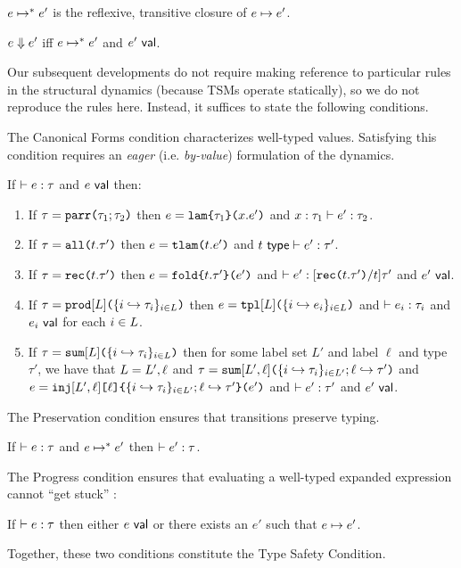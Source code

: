 \begin{definition}\label{defn:iterated-transition-U} $e \mapsto^{*} e'$ is the reflexive, transitive closure of $e \mapsto e'$.\end{definition}

\begin{definition}[Evaluation]\label{defn:evaluation-U}  $e \Downarrow e'$ iff $e \mapsto^{*} e'$ and $e'~\mathsf{val}$. \end{definition}

Our subsequent developments do not require making reference to particular rules in the structural dynamics (because TSMs operate statically), so we do not reproduce the rules here. Instead, it suffices to state the following conditions.

The Canonical Forms condition characterizes well-typed values. Satisfying this condition requires an \emph{eager} (i.e. \emph{by-value}) formulation of the dynamics. 
\begin{condition}\label{condition:canonical-forms-U} If $\vdash e : \tau$ and $e~\mathsf{val}$ then:
\begin{enumerate}
\item If $\tau=\texttt{parr}\texttt{(}\tau_1; \tau_2\texttt{)}$ then $e=\texttt{lam}\texttt{\{}\tau_1\texttt{\}(}x.e'\texttt{)}$ and $x : \tau_1 \vdash e' : \tau_2$.
\item If $\tau=\texttt{all}\texttt{(}t.\tau'\texttt{)}$ then $e=\texttt{tlam}\texttt{(}t.e'\texttt{)}$ and $t~\mathsf{type} \vdash e' : \tau'$.
\item If $\tau=\texttt{rec}\texttt{(}t.\tau'\texttt{)}$ then $e=\texttt{fold}\texttt{\{}t.\tau'\texttt{\}(}e'\texttt{)}$ and $\vdash e' : [\texttt{rec}\texttt{(}t.\tau'\texttt{)}/t]\tau'$ and $e'~\mathsf{val}$. 
\item If $\tau=\texttt{prod}[L]\texttt{(}\{i \hookrightarrow \tau_{i}\}_{i \in L}\texttt{)}$ then $e=\texttt{tpl}[L]\texttt{(}\{i \hookrightarrow e_{i}\}_{i \in L}\texttt{)}$ and $\vdash e_i : \tau_i$ and $e_i~\mathsf{val}$ for each $i \in L$.
\item If $\tau=\texttt{sum}[L]\texttt{(}\{i \hookrightarrow \tau_{i}\}_{i \in L}\texttt{)}$ then for some label set $L'$ and label $\ell$ and type $\tau'$, we have that $L=L', \ell$ and $\tau=\texttt{sum}[L', \ell]\texttt{(}\{i \hookrightarrow \tau_{i}\}_{i \in L'}; \ell \hookrightarrow \tau'\texttt{)}$ and $e=\texttt{inj}[L', \ell]\texttt{[}\ell\texttt{]\{}\{i \hookrightarrow \tau_{i}\}_{i \in L'}; \ell \hookrightarrow \tau'\texttt{\}(}e'\texttt{)}$ and $\vdash e' : \tau'$ and $e'~\mathsf{val}$.
\end{enumerate}\end{condition}

The Preservation condition ensures that transitions preserve typing.  
\begin{condition}[Preservation]\label{condition:preservation-U} If $\vdash e : \tau$ and $e \mapsto^{*} e'$ then $\vdash e' : \tau$. \end{condition}
The Progress condition ensures that evaluating a well-typed expanded expression cannot ``get stuck'' :
\begin{condition}[Progress]\label{condition:progress-U} If $\vdash e : \tau$ then either $e~\mathsf{val}$ or there exists an $e'$ such that $e \mapsto e'$. \end{condition}
 Together, these two conditions constitute the Type Safety Condition.

